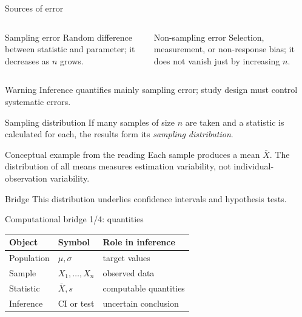 \documentclass[10pt,aspectratio=169]{beamer}
\begin{document}
\begin{frame}{Sources of error}
  \footnotesize
  \begin{columns}[T]
      \begin{block}{Sampling error}
        Random difference between statistic and parameter; it decreases as $n$
        grows.
      \end{block}
      \begin{block}{Non-sampling error}
        Selection, measurement, or non-response bias; it does not vanish just
        by increasing $n$.
      \end{block}
  \end{columns}
  \begin{alertblock}{Warning}
    Inference quantifies mainly sampling error; study design must control
    systematic errors.
  \end{alertblock}
\end{frame}

\begin{frame}{Sampling distribution}
  \footnotesize
  If many samples of size $n$ are taken and a statistic is calculated for each,
  the results form its \emph{sampling distribution}.
  \begin{block}{Conceptual example from the reading}
    Each sample produces a mean $\bar X$. The distribution of all means measures
    estimation variability, not individual-observation variability.
  \end{block}
  \begin{alertblock}{Bridge}
    This distribution underlies confidence intervals and hypothesis tests.
  \end{alertblock}
\end{frame}

\begin{frame}{Computational bridge 1/4: quantities}
  \footnotesize
  \begin{tabular}{lll}
    \hline
    Object & Symbol & Role in inference \\
    \hline
    Population & $\mu,\sigma$ & target values \\
    Sample & $X_1,\ldots,X_n$ & observed data \\
    Statistic & $\bar X,s$ & computable quantities \\
    Inference & CI or test & uncertain conclusion \\
    \hline
  \end{tabular}
\end{frame}
\end{document}
